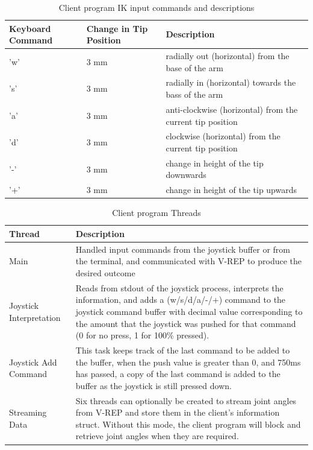 \documentclass[12pt,openany,a4paper]{book}
\begin{document}
\begin{center}
\begin{table}[htb]

    \begin{tabular}{| l | l | p{6cm} |}
     \hline
     Keyboard Command & Change in Tip Position & Description  \\ 
     \hline
     'w' & 3 mm & radially out (horizontal) from the base of the arm \\ 
     \hline
     's' & 3 mm & radially in (horizontal) towards the bass of the arm \\ 
     \hline
     'a' & 3 mm & anti-clockwise (horizontal) from the current tip position \\ 				 \hline
     'd' & 3 mm & clockwise (horizontal) from the current tip position \\ 
     \hline
     '-' & 3 mm & change in height of the tip downwards \\ 
     \hline
     '+' & 3 mm & change in height of the tip upwards \\ 
     \hline
    \end{tabular}
    \caption{Client program IK input commands and descriptions}
\end{table}
\end{center}

\vspace{\baselineskip}

\begin{center}
\begin{table}[htb]
    
    \begin{tabular}{| l | p{10cm} |}
    \hline
     Thread & Description     \\
     \hline
     Main & Handled input commands from the joystick buffer or from the terminal, and communicated with V-REP to produce the desired outcome  \\
     \hline 
     Joystick Interpretation & Reads from stdout of the joystick process, interprets the information, and adds a (w/s/d/a/-/+) command to the joystick command buffer with decimal value corresponding to the amount that the joystick was pushed for that command (0 for no press, 1 for 100\% pressed).\\
     \hline
     Joystick Add Command & This task keeps track of the last command to be added to the buffer, when the push value is greater than 0, and 750ms has passed, a copy of the last command is added to the buffer as the joystick is still pressed down. \\ \hline
     \hline
     Streaming Data & Six threads can optionally be created to stream joint angles from V-REP and store them in the client's information struct. Without this mode, the client program will block and retrieve joint angles when they are required.
     \\ \hline
    \end{tabular}
    \caption{Client program Threads}
\end{table}
\end{center}
\end{document}
